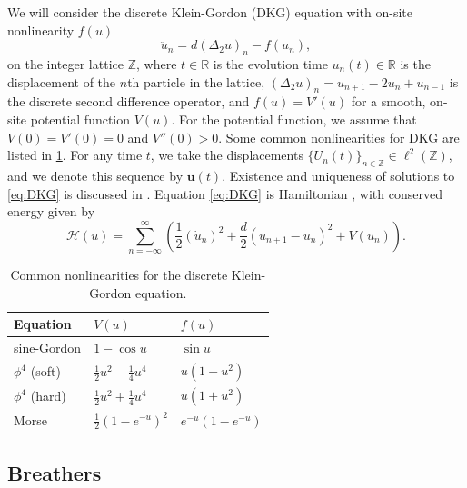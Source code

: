 \documentclass[12pt,reqno]{amsart}
\def\R{{\mathbb R}}
\def\Z{{\mathbb Z}}
\newcommand{\uvec}{\mathbf{u}}
\begin{document}
We will consider the discrete Klein-Gordon (DKG) equation with on-site nonlinearity $f(u)$
\begin{equation}\label{eq:DKG}
\ddot{u}_n = d (\Delta_2 u)_n - f(u_n),
\end{equation}
on the integer lattice $\Z$, where $t \in \R$ is the evolution time $u_n(t) \in \R$ is the displacement of the $n$th particle in the lattice, $(\Delta_2 u)_n = u_{n+1} - 2 u_n + u_{n-1}$ is the discrete second difference operator, and $f(u) = V'(u)$ for a smooth, on-site potential function $V(u)$. For the potential function, we assume that $V(0) = V'(0) = 0$ and $V''(0) > 0$. Some common nonlinearities for DKG are listed in \cref{table:V}. For any time $t$, we take the displacements $\{U_n(t)\}_{n \in \Z} \in \ell^2(\Z)$, and we denote this sequence by $\uvec(t)$. Existence and uniqueness of solutions to \cref{eq:DKG} is discussed in \cite{cuevas-maraver2016}. Equation \cref{eq:DKG} is Hamiltonian \cites{KevrekidisWeinstein2000,cuevas-maraver2016}, with conserved energy given by
\begin{equation}\label{eq:H}
	\mathcal{H}(u) = \sum_{n=-\infty}^\infty 
	\left( \frac{1}{2} (\dot{u}_n)^2 + \frac{d}{2} (u_{n+1} - u_n)^2 + V(u_n) \right).
\end{equation}

\begin{table}
\begin{tabular}{lll}\toprule
Equation & $V(u)$ & $f(u)$ \\ \midrule
sine-Gordon & $1 - \cos u$ & $\sin u$ \\
$\phi^4$ (soft) & $\frac{1}{2}u^2 - \frac{1}{4}u^4$ & $u(1-u^2)$ \\
$\phi^4$ (hard) & $\frac{1}{2}u^2 + \frac{1}{4}u^4$ & $u(1+u^2)$ \\
Morse & $\frac{1}{2}(1 - e^{-u})^2$ & $e^{-u}(1 - e^{-u})$ \\ \bottomrule
\end{tabular}
\caption{Common nonlinearities for the discrete Klein-Gordon equation.}
\label{table:V}
\end{table}

\subsection{Breathers}
\end{document}
